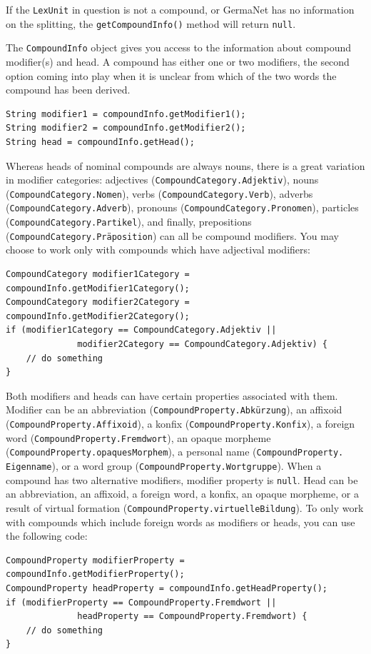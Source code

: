 \documentclass[12pt,a4paper,english,utf8]{report}
\begin{document}
If the \texttt{LexUnit} in question is not a compound, or GermaNet has no information on the splitting, the \texttt{getCompoundInfo()} method will return \texttt{null}.

The \texttt{CompoundInfo} object gives you access to the information about compound modifier(s) and head. A compound has either one or two modifiers, the second option coming into play when it is unclear from which of the two words the compound has been derived.

\begin{lstlisting}
String modifier1 = compoundInfo.getModifier1();
String modifier2 = compoundInfo.getModifier2();
String head = compoundInfo.getHead();
\end{lstlisting}

Whereas heads of nominal compounds are always nouns, there is a great variation in modifier categories: adjectives (\texttt{CompoundCategory.Adjektiv}), nouns (\texttt{CompoundCategory.Nomen}), verbs (\texttt{CompoundCategory.Verb}), adverbs (\texttt{CompoundCategory.Adverb}), pronouns (\texttt{CompoundCategory.Pronomen}), particles (\texttt{CompoundCategory.Partikel}), and finally, prepositions \\ (\texttt{CompoundCategory.Präposition}) can all be compound modifiers. You may choose to work only with compounds which have adjectival modifiers:

\begin{lstlisting}
CompoundCategory modifier1Category = compoundInfo.getModifier1Category();
CompoundCategory modifier2Category = compoundInfo.getModifier2Category();
if (modifier1Category == CompoundCategory.Adjektiv ||
              modifier2Category == CompoundCategory.Adjektiv) {
    // do something
}
\end{lstlisting}

Both modifiers and heads can have certain properties associated with them. Modifier can be an abbreviation (\texttt{CompoundProperty.Abkürzung}), an affixoid (\texttt{CompoundProperty.Affixoid}), a konfix (\texttt{CompoundProperty.Konfix}), a foreign word (\texttt{CompoundProperty.Fremdwort}), an opaque morpheme \\ (\texttt{CompoundProperty.opaquesMorphem}), a personal name (\texttt{CompoundProperty.\\Eigenname}), or a word group (\texttt{CompoundProperty.Wortgruppe}). When a compound has two alternative modifiers, modifier property is \texttt{null}. Head can be an abbreviation, an affixoid, a foreign word, a konfix, an opaque morpheme, or a result of virtual formation (\texttt{CompoundProperty.virtuelleBildung}). To only work with compounds which include foreign words as modifiers or heads, you can use the following code:

\begin{lstlisting}
CompoundProperty modifierProperty = compoundInfo.getModifierProperty();
CompoundProperty headProperty = compoundInfo.getHeadProperty();
if (modifierProperty == CompoundProperty.Fremdwort ||
              headProperty == CompoundProperty.Fremdwort) {
    // do something
}
\end{lstlisting}
\end{document}
